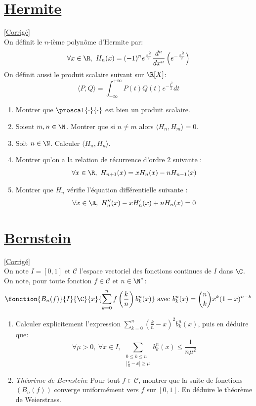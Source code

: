 \documentclass{book}
\begin{document}
	\section{\underline{Hermite} }
	\textcolor{blue}{\hyperref[sec:Hermite]{[Corrigé]}}\\
	\label{Hermite}
	On définit le $n$-ième polynôme d'Hermite par: $$\forall x\in \R,\ H_n(x)=(-1)^n e^{\frac{x^2}{2}}\frac{d^n}{dx^n}\left(e^{-\frac{x^2}{2}}\right)$$
	On définit aussi le produit scalaire suivant sur $\R[X]$: $$\langle P,Q \rangle=\int_{-\infty}^{+\infty}P(t)Q(t)e^{-\frac{t^2}{2}}dt$$
	\begin{enumerate}
		\item Montrer que $\proscal{\cdot}{\cdot}$ est bien un produit scalaire.
		\item Soient $m,n \in\N$. Montrer que si $n\ne m$ alors $\langle H_n,H_m\rangle=0$.
		\item Soit $n\in\N$. Calculer $\langle H_n,H_n\rangle$.
		\item Montrer qu'on a la relation de récurrence d'ordre 2 suivante : $$\forall x\in\R,\ H_{n+1}(x)=xH_n(x)-nH_{n-1}(x)$$
		\item Montrer que $H_n$ vérifie l'équation différentielle suivante : $$\forall x\in\R,\ H_n''(x)-xH_n'(x)+nH_n(x)=0$$
	\end{enumerate}
	
	\section{\underline{Bernstein} }
	\textcolor{blue}{\hyperref[sec:Bernstein]{[Corrigé]}}\\
	\label{Bernstein}
	On note $I=[0,1]$ et $\mathcal C$ l'espace vectoriel des fonctions continues de $I$ dans $\C$. \\ On note, pour toute fonction $f\in\mathcal C$ et $n\in\N^*$: $$\fonction{B_n(f)}{I}{\C}{x}{\displaystyle\sum_{k=0}^{n}f\left(\frac{k}{n}\right)b_k^n(x)} \ \text{avec} \ b_k^n(x)=\binom{n}{k}x^k(1-x)^{n-k}$$
	\begin{enumerate}
		\item Calculer explicitement l'expression $\displaystyle\sum_{k=0}^n\left( \frac{k}{n}-x\right)^2b_k^n(x)$, puis en déduire que: $$\forall\mu>0, \ \forall x\in I, \ \displaystyle\sum\limits_{\substack{0\leq k\leq n\\|\frac{k}{n}-x|\geq \mu}}{b_k^n(x)} \leq \frac{1}{n\mu^2}$$
		\item \textit{Théorème de Bernstein}: Pour tout $f\in\mathcal C$, montrer que la suite de fonctions $(B_n(f))$ converge uniformément vers $f$ sur $[0,1]$. En déduire le théorème de Weierstrass.
	\end{enumerate}
	
\end{document}
